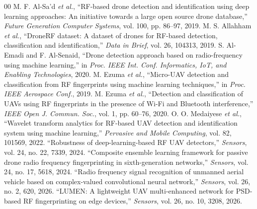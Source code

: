 \documentclass[11pt,conference,a4paper]{IEEEtran}
\begin{document}
\begin{thebibliography}{00}
 M. F. Al-Sa'd \textit{et al.}, ``RF-based drone detection
and identification using deep learning approaches: An initiative towards a large
open source drone database,'' \textit{Future Generation Computer Systems},
vol. 100, pp. 86--97, 2019.
 M. S. Allahham \textit{et al.}, ``DroneRF dataset: A
dataset of drones for RF-based detection, classification and identification,''
\textit{Data in Brief}, vol. 26, 104313, 2019.
 S. Al-Emadi and F. Al-Senaid, ``Drone detection approach
based on radio-frequency using machine learning,'' in \textit{Proc. IEEE Int.
Conf. Informatics, IoT, and Enabling Technologies}, 2020.
 M. Ezuma \textit{et al.}, ``Micro-UAV detection and
classification from RF fingerprints using machine learning techniques,'' in
\textit{Proc. IEEE Aerospace Conf.}, 2019.
 M. Ezuma \textit{et al.}, ``Detection and classification
of UAVs using RF fingerprints in the presence of Wi-Fi and Bluetooth
interference,'' \textit{IEEE Open J. Commun. Soc.}, vol. 1, pp. 60--76, 2020.
 O. O. Medaiyese \textit{et al.}, ``Wavelet transform
analytics for RF-based UAV detection and identification system using machine
learning,'' \textit{Pervasive and Mobile Computing}, vol. 82, 101569, 2022.
 ``Robustness of deep-learning-based RF UAV detectors,''
\textit{Sensors}, vol. 24, no. 22, 7339, 2024.
 ``Composite ensemble learning framework for passive
drone radio frequency fingerprinting in sixth-generation networks,''
\textit{Sensors}, vol. 24, no. 17, 5618, 2024.
 ``Radio frequency signal recognition of unmanned aerial
vehicle based on complex-valued convolutional neural network,''
\textit{Sensors}, vol. 26, no. 2, 620, 2026.
 ``LUMEN: A lightweight UAV multi-enhanced network for
PSD-based RF fingerprinting on edge devices,'' \textit{Sensors}, vol. 26,
no. 10, 3208, 2026.
\end{thebibliography}
\end{document}
